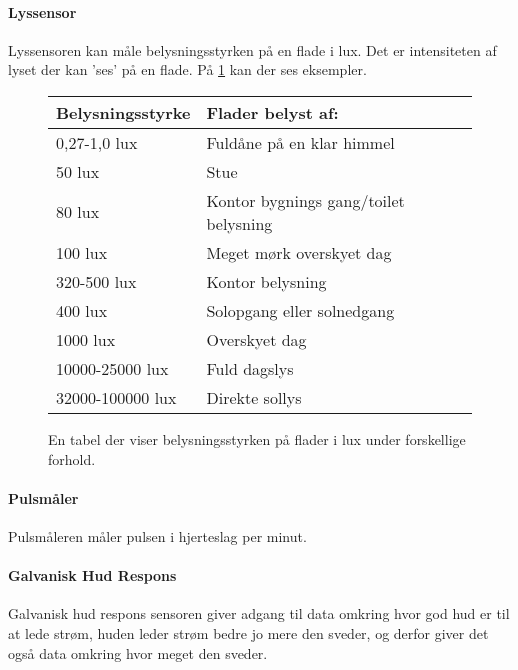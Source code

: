 \paragraph{Lyssensor}
Lyssensoren kan måle belysningsstyrken på en flade i lux. Det er intensiteten af lyset der kan 'ses' på en flade. På \cref{fig:lux}  kan der ses eksempler.

\begin{figure}
	\centering
\begin{tabular}{ l | l}
	\textbf{Belysningsstyrke} & \textbf{Flader belyst af: }\\
\hline
0,27-1,0 lux &  Fuldåne på en klar himmel \\
\hline
50 lux & Stue \\
\hline
80 lux & Kontor bygnings gang/toilet belysning \\
\hline
100 lux & Meget mørk overskyet dag \\
\hline
320-500 lux & Kontor belysning \\
\hline
400 lux & Solopgang eller solnedgang \\
\hline
1000 lux & Overskyet dag \\
\hline
10000-25000 lux & Fuld dagslys \\
\hline
32000-100000 lux & Direkte sollys\\
\hline
\end{tabular}
\caption{En tabel der viser belysningsstyrken på flader i lux under forskellige forhold. \citep{misc:lux}}
\label{fig:lux}
\end{figure}

\paragraph{Pulsmåler}
Pulsmåleren måler pulsen i hjerteslag per minut.

\paragraph{Galvanisk Hud Respons}
Galvanisk hud respons sensoren giver adgang til data omkring hvor god hud er til at lede strøm, huden leder strøm bedre jo mere den sveder, og derfor giver det også data omkring hvor meget den sveder.